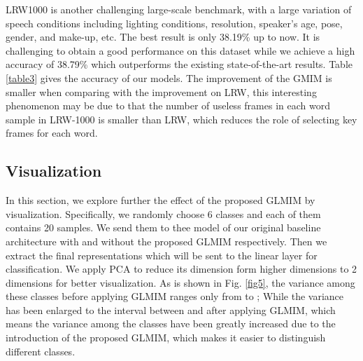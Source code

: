 \documentclass[a4paper, 10pt, conference]{ieeeconf}      \usepackage{FG2020}
\begin{document}
LRW1000 is another challenging large-scale benchmark, with a large variation of speech conditions including lighting conditions, resolution, speaker’s age, pose, gender, and make-up, etc. The best result is only 38.19\% up to now. It is challenging to obtain a good performance on this dataset while we achieve a high accuracy of 38.79\% which outperforms the existing state-of-the-art results. Table \ref{table3} gives the accuracy of our models. The improvement of the GMIM is smaller when comparing with the improvement on LRW, this interesting phenomenon may be due to that the number of useless frames in each word sample in LRW-1000 is smaller than LRW, which reduces the role of selecting key frames for each word.
\subsection{Visualization}






 \begin{figure*}[t]
\centering
{}\hspace{0.6in}
\caption{An example of the visualization for the final representations form the Bi-GRU. With the help of the GLMIM, the architecture gets more discriminative results.}
\label{fig5} \end{figure*}
In this section, we explore further the effect of the proposed GLMIM by visualization. Specifically, we randomly choose 6 classes and each of them contains 20 samples. We send them to thee model of our original baseline architecture with and without the proposed GLMIM respectively. Then we extract the final representations  which will be sent to the linear layer for classification. We apply PCA to reduce its dimension form higher dimensions to 2 dimensions for better visualization. As is shown in Fig. \ref{fig5}, the variance among these classes before applying GLMIM ranges only from  to ; While the variance has been enlarged to the interval between  and  after applying GLMIM, which means the variance among the classes have been greatly increased due to the introduction of the proposed GLMIM, which makes it easier to distinguish different classes.
\end{document}
